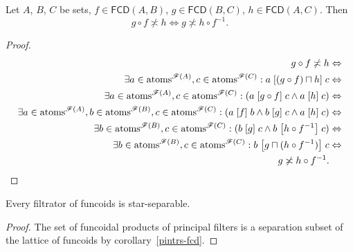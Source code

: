 \begin{thm}
\label{fcd-cross}Let $A$, $B$, $C$ be sets, $f\in\mathsf{FCD}(A,B)$,
$g\in\mathsf{FCD}(B,C)$, $h\in\mathsf{FCD}(A,C)$. Then
\[
g\circ f\nasymp h\Leftrightarrow g\nasymp h\circ f^{-1}.
\]
\end{thm}
\begin{proof}
~
\begin{align*}
g\circ f\not\asymp h & \Leftrightarrow\\
\exists a\in\operatorname{atoms}^{\mathscr{F}(A)},c\in\operatorname{atoms}^{\mathscr{F}(C)}:a\mathrel{\left[(g\circ
f)\sqcap h\right]}c & \Leftrightarrow\\
\exists a\in\operatorname{atoms}^{\mathscr{F}(A)},c\in\operatorname{atoms}^{\mathscr{F}(C)}:(a\mathrel{\left[g\circ
f\right]}c\land a\mathrel{\left[h\right]}c) & \Leftrightarrow\\
\exists
a\in\operatorname{atoms}^{\mathscr{F}(A)},b\in\operatorname{atoms}^{\mathscr{F}(B)},c\in\operatorname{atoms}^{\mathscr{F}
(C)}:(a\mathrel{\left[f\right]}b\land b\mathrel{\left[g\right]}c\land a\mathrel{\left[h\right]}c) & \Leftrightarrow\\
\exists b\in\operatorname{atoms}^{\mathscr{F}(B)},c\in\operatorname{atoms}^{\mathscr{F}(C)}:(b\mathrel{\left[g\right]}c\land b\mathrel{\left[h\circ f^{-1}\right]}c) & \Leftrightarrow\\
\exists
b\in\operatorname{atoms}^{\mathscr{F}(B)},c\in\operatorname{atoms}^{\mathscr{F}(C)}:b\mathrel{\left[g\sqcap(h\circ
f^{-1})\right]}c & \Leftrightarrow\\
g\not\asymp h\circ f^{-1}.
\end{align*}

\end{proof}

\begin{thm}
Every filtrator of funcoids is star-separable.\end{thm}
\begin{proof}
The set of funcoidal products of principal filters is a separation
subset of the lattice of funcoids by corollary~\ref{pintrs-fcd}.
\end{proof}

